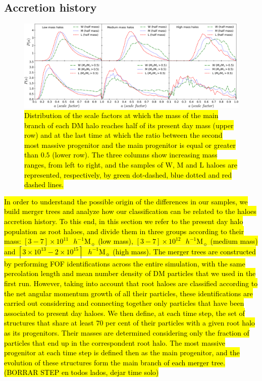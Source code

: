 \documentclass[fleqn,usenatbib]{mnras}
\newcommand{\hMsun}{{\textrm{ $h^{-1}$M$_{\sun}$}}}
\newcommand{\Wh}{\mathrm{W}}
\newcommand{\Lh}{\mathrm{L}}
\newcommand{\Mh}{\mathrm{M}}
\begin{document}
\subsection{Accretion history}

\begin{figure}
	\includegraphics[width=2\columnwidth]{400Mpc_figs/acrecion_M123_adb.pdf}
    \caption{\hl{Distribution of the scale factors at which the mass of the main branch of each DM halo reaches half of its present day mass (upper row) and at the last time at which the ratio between the second most massive progenitor and the main progenitor is equal or greater than $0.5$  (lower row). The three columns show increasing mass ranges, from left to right, and the samples of $\Wh$, $\Mh$ and $\Lh$ haloes are represented, respectively, by green dot-dashed, blue dotted and red dashed lines.}}
    \label{fig:acrecion_M123}
\end{figure}

\hl{In order to understand the possible origin of the differences in our samples, we build merger trees and analyze how our classification can be related to the haloes accretion history. To this end, in this section we refer to the present day halo population as root haloes, and divide them in three groups according to their mass: $[3 - 7]\times10^{11}\hMsun$ (low mass), $[3 - 7]\times10^{12}\hMsun$ (medium mass) and $[3\times10^{13} - 2\times10^{15}]\hMsun$ (high mass).
The merger trees are constructed by performing FOF identifications across the entire simulation, with the same percolation length and mean number density of DM particles that we used in the first run.
However, taking into account that root haloes are classified according to the net angular momentum growth of all their particles, these identifications are carried out considering and connecting together only particles that have been associated to present day haloes. We then define, at each time step, the set of structures that share at least $70$ per cent of their particles with a given root halo as its progenitors. Their masses are determined considering only the fraction of particles that end up in the correspondent root halo. The most massive progenitor at each time step is defined then as the main progenitor, and the evolution of these structures form the main branch of each merger tree.(BORRAR STEP en todos lados, dejar time solo)}
\end{document}
